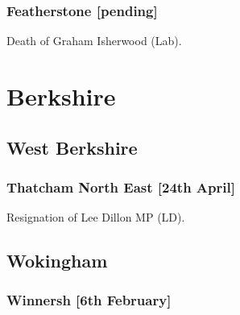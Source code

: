 \documentclass[a4paper,openany]{book}
\begin{document}
\begin{resultsiii}
%
%
%

\subsubsection*{Featherstone \hspace*{\fill}\nolinebreak[1]%
	\enspace\hspace*{\fill}
	[pending]}


Death of Graham Isherwood (Lab).

\section{Berkshire}

\subsection*{West Berkshire}

\subsubsection*{Thatcham North East \hspace*{\fill}\nolinebreak[1]%
	\enspace\hspace*{\fill}
	[24th April]}


Resignation of Lee Dillon MP (LD).

\subsection*{Wokingham}

\subsubsection*{Winnersh \hspace*{\fill}\nolinebreak[1]%
	\enspace\hspace*{\fill}
	[6th February]}


\end{resultsiii}
\end{document}
